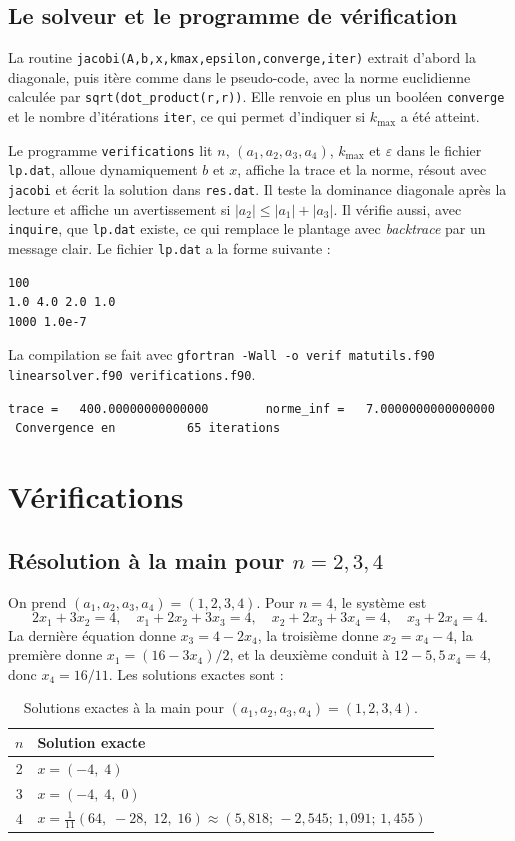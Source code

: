 \documentclass[a4paper]{scrartcl}
\begin{document}
\subsection{Le solveur et le programme de vérification}

La routine \lstinline{jacobi(A,b,x,kmax,epsilon,converge,iter)} extrait d'abord la diagonale, puis itère comme dans le 
pseudo-code, avec la norme euclidienne calculée par \lstinline{sqrt(dot_product(r,r))}. Elle renvoie en plus un booléen
\lstinline{converge} et le nombre d'itérations \lstinline{iter}, ce qui permet d'indiquer si $k_{\max}$ a été atteint.

Le programme \lstinline{verifications} lit $n$, $(a_1,a_2,a_3,a_4)$, $k_{\max}$ et $\varepsilon$ dans le fichier
\lstinline{lp.dat}, alloue dynamiquement $b$ et $x$, affiche la trace et la norme, résout avec \lstinline{jacobi} 
et écrit la solution dans \lstinline{res.dat}. Il teste la dominance diagonale après la lecture et affiche un avertissement 
si $|a_2|\le|a_1|+|a_3|$. Il vérifie aussi, avec \lstinline{inquire}, que \lstinline{lp.dat} existe, ce qui remplace le 
plantage avec \textit{backtrace} par un message clair. Le fichier \lstinline{lp.dat} a la forme suivante :
\begin{lstlisting}[language={}]
100
1.0 4.0 2.0 1.0
1000 1.0e-7
\end{lstlisting}
La compilation se fait avec \lstinline{gfortran -Wall -o verif matutils.f90 linearsolver.f90 verifications.f90}.
\begin{lstlisting}[language={}]
     trace =   400.00000000000000        norme_inf =   7.0000000000000000     
 Convergence en          65 iterations
\end{lstlisting}
\section{Vérifications}

\subsection{Résolution à la main pour $n=2,3,4$}

On prend $(a_1,a_2,a_3,a_4)=(1,2,3,4)$. Pour $n=4$, le système est
\[
2x_1+3x_2=4,\quad x_1+2x_2+3x_3=4,\quad x_2+2x_3+3x_4=4,\quad x_3+2x_4=4.
\]
La dernière équation donne $x_3=4-2x_4$, la troisième donne $x_2=x_4-4$, la première donne $x_1=(16-3x_4)/2$, 
et la deuxième conduit à $12-5{,}5\,x_4=4$, donc $x_4=16/11$. Les solutions exactes sont :
\begin{table}[!ht]
\centering
\begin{tabular}{|c|l|}
\hline
$n$ & Solution exacte \\ \hline
2 & $x=(-4,\;4)$ \\ \hline
3 & $x=(-4,\;4,\;0)$ \\ \hline
4 & $x=\frac{1}{11}(64,\;-28,\;12,\;16)\approx(5{,}818;\,-2{,}545;\,1{,}091;\,1{,}455)$ \\ \hline
\end{tabular}
\caption{Solutions exactes à la main pour $(a_1,a_2,a_3,a_4)=(1,2,3,4)$.}
\label{tbl:main}
\end{table}
\end{document}
